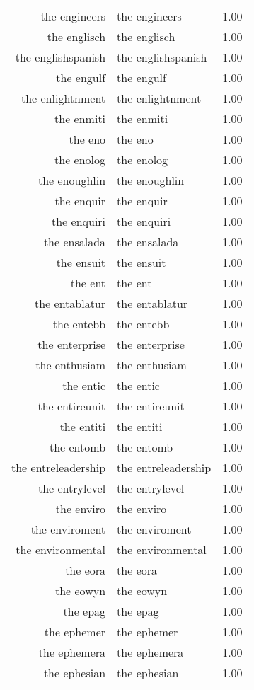 \begin{table}[ht]
\begin{tabular}{rlr}
  the engineers & the engineers & 1.00 \\ 
  the englisch & the englisch & 1.00 \\ 
  the englishspanish & the englishspanish & 1.00 \\ 
  the engulf & the engulf & 1.00 \\ 
  the enlightnment & the enlightnment & 1.00 \\ 
  the enmiti & the enmiti & 1.00 \\ 
  the eno & the eno & 1.00 \\ 
  the enolog & the enolog & 1.00 \\ 
  the enoughlin & the enoughlin & 1.00 \\ 
  the enquir & the enquir & 1.00 \\ 
  the enquiri & the enquiri & 1.00 \\ 
  the ensalada & the ensalada & 1.00 \\ 
  the ensuit & the ensuit & 1.00 \\ 
  the ent & the ent & 1.00 \\ 
  the entablatur & the entablatur & 1.00 \\ 
  the entebb & the entebb & 1.00 \\ 
  the enterprise & the enterprise & 1.00 \\ 
  the enthusiam & the enthusiam & 1.00 \\ 
  the entic & the entic & 1.00 \\ 
  the entireunit & the entireunit & 1.00 \\ 
  the entiti & the entiti & 1.00 \\ 
  the entomb & the entomb & 1.00 \\ 
  the entreleadership & the entreleadership & 1.00 \\ 
  the entrylevel & the entrylevel & 1.00 \\ 
  the enviro & the enviro & 1.00 \\ 
  the enviroment & the enviroment & 1.00 \\ 
  the environmental & the environmental & 1.00 \\ 
  the eora & the eora & 1.00 \\ 
  the eowyn & the eowyn & 1.00 \\ 
  the epag & the epag & 1.00 \\ 
  the ephemer & the ephemer & 1.00 \\ 
  the ephemera & the ephemera & 1.00 \\ 
  the ephesian & the ephesian & 1.00 \\ 

\end{tabular}
\end{table}
